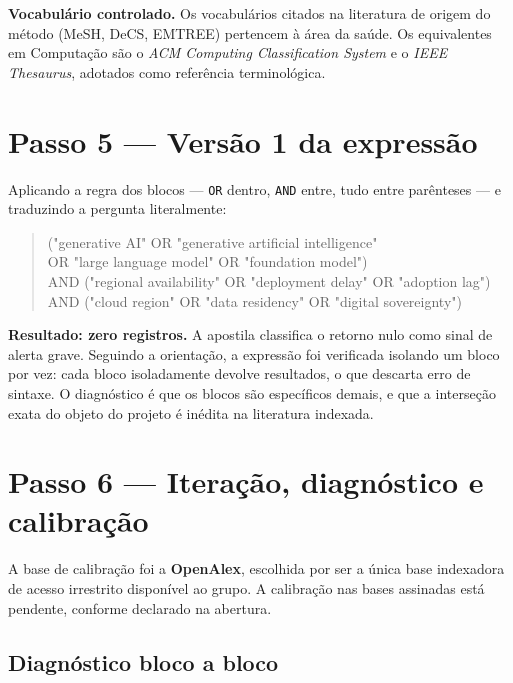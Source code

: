 \documentclass[12pt,a4paper]{article}
\begin{document}
\noindent\textbf{Vocabulário controlado.} Os vocabulários citados na literatura de origem
do método (MeSH, DeCS, EMTREE) pertencem à área da saúde. Os equivalentes em Computação
são o \textit{ACM Computing Classification System} e o \textit{IEEE Thesaurus}, adotados
como referência terminológica.

\section{Passo 5 --- Versão 1 da expressão}

Aplicando a regra dos blocos --- \texttt{OR} dentro, \texttt{AND} entre, tudo entre
parênteses --- e traduzindo a pergunta literalmente:

\begin{quote}\scriptsize\ttfamily
("generative AI" OR "generative artificial intelligence"\\
 OR "large language model" OR "foundation model")\\
AND ("regional availability" OR "deployment delay" OR "adoption lag")\\
AND ("cloud region" OR "data residency" OR "digital sovereignty")
\end{quote}

\noindent\textbf{Resultado: zero registros.} A apostila classifica o retorno nulo como
sinal de alerta grave. Seguindo a orientação, a expressão foi verificada isolando um bloco
por vez: cada bloco isoladamente devolve resultados, o que descarta erro de sintaxe. O
diagnóstico é que os blocos são específicos demais, e que a interseção exata do objeto do
projeto é inédita na literatura indexada.

\section{Passo 6 --- Iteração, diagnóstico e calibração}
\label{sec:diag}

A base de calibração foi a \textbf{OpenAlex}, escolhida por ser a única base indexadora de
acesso irrestrito disponível ao grupo. A calibração nas bases assinadas está pendente,
conforme declarado na abertura.

\subsection{Diagnóstico bloco a bloco}
\end{document}
